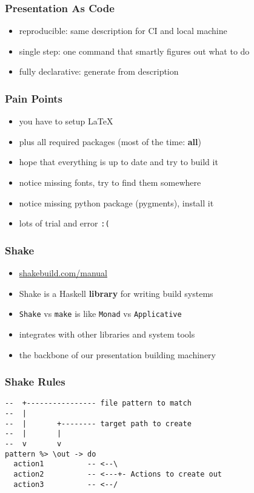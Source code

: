 \documentclass{beamer}
\begin{document}
\begin{frame}
  \frametitle{Presentation As Code}
  \begin{itemize}
  \item reproducible: same description for CI and local machine
  \item single step: one command that smartly figures out what to do
  \item fully declarative: generate from description
  \end{itemize}
\end{frame}

\begin{frame}
  \frametitle{Pain Points}
  \begin{itemize}
  \item you have to setup LaTeX
  \item plus all required packages (most of the time: \textbf{all})
  \item hope that everything is up to date and try to build it
  \item notice missing fonts, try to find them somewhere
  \item notice missing python package (pygments), install it
  \item lots of trial and error \texttt{:(}
  \end{itemize}
\end{frame}

\begin{frame}
  \frametitle{Shake}
  \begin{itemize}
  \item \url{shakebuild.com/manual}
  \item Shake is a Haskell \textbf{library} for writing build systems
  \item \texttt{Shake} vs \texttt{make} is like \texttt{Monad} vs \texttt{Applicative}
  \item integrates with other libraries and system tools
  \item the backbone of our presentation building machinery
  \end{itemize}
\end{frame}

\begin{frame}[fragile]
  \frametitle{Shake Rules}
  \begin{verbatim}
--  +---------------- file pattern to match
--  |
--  |       +-------- target path to create
--  |       |
--  v       v
pattern %> \out -> do
  action1          -- <--\
  action2          -- <---+- Actions to create out
  action3          -- <--/
  \end{verbatim}
\end{frame}
\end{document}
